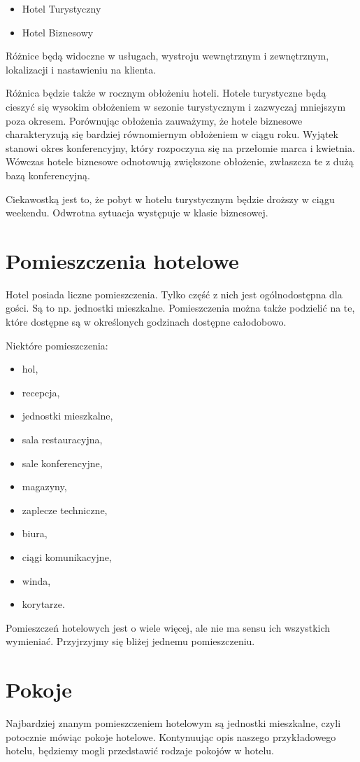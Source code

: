 \documentclass[a4paper,onecolumn,oneside,11pt,wide,floatssmall]{mwrep}
\theoremstyle{definition}
\theoremstyle{plain}%
\theoremstyle{remark}
\begin{document}
\begin{itemize}
  \item Hotel Turystyczny
  \item Hotel Biznesowy
\end{itemize}

Różnice będą widoczne w usługach, wystroju wewnętrznym i zewnętrznym, 
lokalizacji i nastawieniu na klienta.

Różnica będzie także w rocznym obłożeniu hoteli. Hotele turystyczne będą 
cieszyć się wysokim obłożeniem w sezonie turystycznym i zazwyczaj 
mniejszym poza okresem. Porównując obłożenia zauważymy, że hotele biznesowe 
charakteryzują się bardziej równomiernym obłożeniem w ciągu roku. 
Wyjątek stanowi okres konferencyjny, który rozpoczyna się na przełomie 
marca i kwietnia. Wówczas hotele biznesowe odnotowują zwiększone obłożenie,
 zwłaszcza te z dużą bazą konferencyjną.

Ciekawostką jest to, że pobyt w hotelu turystycznym będzie droższy w ciągu 
weekendu. Odwrotna sytuacja występuje w klasie biznesowej.

\section{Pomieszczenia hotelowe}
Hotel posiada liczne pomieszczenia. Tylko część z nich jest ogólnodostępna 
dla gości. Są to np. jednostki mieszkalne. Pomieszczenia można także 
podzielić na te, które dostępne są w określonych godzinach dostępne całodobowo.

Niektóre pomieszczenia:
\begin{itemize}
\item hol,
\item recepcja,
\item jednostki mieszkalne,
\item sala restauracyjna,
\item sale konferencyjne,
\item magazyny,
\item zaplecze techniczne,
\item biura,
\item ciągi komunikacyjne,
\item winda,
\item korytarze.
\end{itemize}

Pomieszczeń hotelowych jest o wiele więcej, ale nie ma sensu ich wszystkich 
wymieniać. Przyjrzyjmy się bliżej jednemu pomieszczeniu.

\section{Pokoje}
Najbardziej znanym pomieszczeniem hotelowym są jednostki mieszkalne, czyli 
potocznie mówiąc pokoje hotelowe. Kontynuując opis naszego przykładowego 
hotelu, będziemy mogli przedstawić rodzaje pokojów w hotelu.
\end{document}
